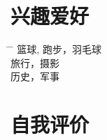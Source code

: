 \documentclass[20pt]{article} %
\begin{document}


\section{兴趣爱好}
\begin{tabbing}%
\hspace{5mm} \= \hspace{14cm} \= \kill %
\sqbullet \> {篮球, 跑步，羽毛球} \\%
\sqbullet \> {旅行，摄影}\\
\sqbullet \> {历史，军事}
\end{tabbing}%

\section{自我评价}
\end{document}
